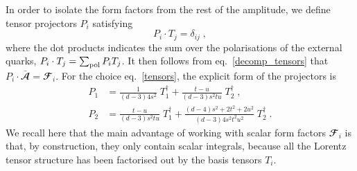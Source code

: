 In order to isolate the form factors from the rest of the amplitude, we define tensor projectors $P_i $ satisfying
\begin{equation}
P_i \cdot T_j = \delta_{ij} \; ,
\end{equation}  
where the dot products indicates the sum over the polarisations of the external quarks, $P_i \cdot T_j = \sum_{\rm pol} P_i T_j$.  
It then follows from eq.~\eqref{decomp_tensors}  that
$
 P_i \cdot \bar{\mathbfcal{A}}  = \mathbfcal{F}_i .
$ 
 For the choice eq.~\eqref{tensors}, the explicit form of the projectors is
 \begin{equation}
   \begin{split}
     P_1 &= \frac{1}{(d-3)4s^2} \; T_1^\dagger +  \frac{t-u}{(d-3)s^2tu}\;  T_2^\dagger \; ,\\
     P_2 &= \frac{t-u}{(d-3)s^2tu} \; T_1^\dagger + \frac{(d-4) s^2+ 2t^2 + 2 u^2}{(d-3) 4 s^2 t^2 u^2} \; T_2^\dagger \; .
   \end{split}
   \label{eq:p12}
 \end{equation}
We recall here that the main advantage of working with scalar form factors $\mathbfcal{F}_i $ 
is that, by construction, they only contain scalar integrals, 
because all the Lorentz tensor structure has been factorised out by the basis tensors ${T_i}$. 

 
